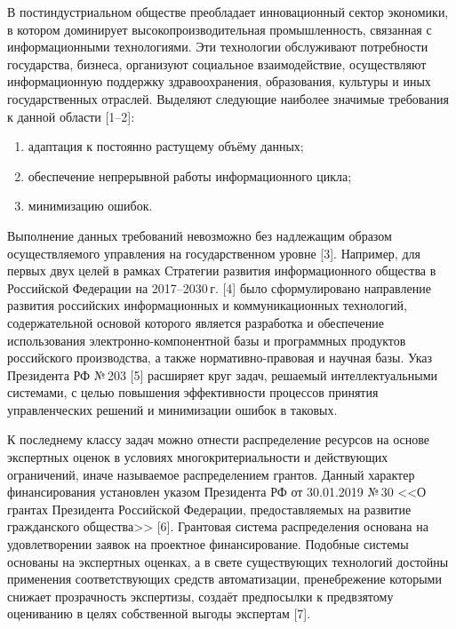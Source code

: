  

\makeProcTitleRazdel
{}

В постиндустриальном обществе преобладает инновационный сектор экономики, в котором доминирует высокопроизводительная промышленность, связанная с информационными технологиями. Эти технологии обслуживают потребности государства, бизнеса, организуют социальное взаимодействие, осуществляют информационную поддержку здравоохранения, образования, культуры и иных государственных отраслей. Выделяют следующие наиболее значимые требования к данной области [1--2]:
\begin{enumerate}[noitemsep]
      \item адаптация к постоянно растущему объёму данных;
      \item обеспечение непрерывной работы информационного цикла;
      \item минимизацию ошибок.
\end{enumerate}

Выполнение данных требований невозможно без надлежащим образом осуществляемого управления на государственном уровне [3]. Например, для первых двух целей в рамках Стратегии развития информационного общества в Российской Федерации на 2017--2030\,г. [4] было сформулировано направление развития российских информационных и коммуникационных технологий, содержательной основой которого является разработка и обеспечение использования электронно-компонентной базы и программных продуктов российского производства, а также нормативно-правовая и научная базы. Указ Президента РФ №\,203 [5] расширяет круг задач, решаемый интеллектуальными системами, с целью повышения эффективности процессов принятия управленческих решений и минимизации ошибок в таковых.

К последнему классу задач можно отнести распределение ресурсов на основе экспертных оценок в условиях многокритериальности и действующих ограничений, иначе называемое распределением грантов. Данный характер финансирования установлен указом Президента РФ от 30.01.2019 №\,30 <<О грантах Президента Российской Федерации, предоставляемых на развитие гражданского общества>> [6]. Грантовая система распределения основана на удовлетворении заявок на проектное финансирование. Подобные системы основаны на экспертных оценках, а в свете существующих технологий достойны применения соответствующих средств автоматизации, пренебрежение которыми снижает прозрачность экспертизы, создаёт предпосылки к предвзятому оцениванию в целях собственной выгоды экспертам [7].

